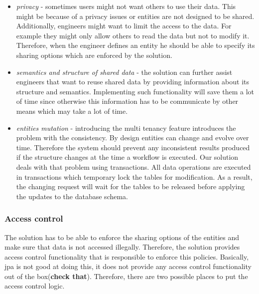 \documentclass[a4paper, notitlepage]{article}
\begin{document}
\begin{itemize}

	\item \textit{privacy} - sometimes users might not want others to use their data. This might be because of a privacy issues or entities are not designed to be shared. Additionally, engineers might want to limit the access to the data. For example they might only allow others to read the data but not to modify it. Therefore, when the engineer defines an entity he should be able to specify its sharing options which are enforced by the solution.
	 
	\item \textit{semantics and structure of shared data} - the solution can further assist engineers that want to reuse shared data by providing information about its structure and semantics. Implementing such functionality will save them a lot of time since otherwise this information has to be communicate by other means which may take a lot of time.
	
	\item \textit{entities mutation} - introducing the multi tenancy feature introduces the problem with the consistency. By design entities can change and evolve over time. Therefore the system should prevent any inconsistent results produced if the structure changes at the time a workflow is executed. Our solution deals with that problem using transactions. All data operations are executed in transactions which temporary lock the tables for modification. As a result, the changing request will wait for the tables to be released before applying the updates to the database schema.
\end{itemize}


\subsubsection{Access control}

The solution has to be able to enforce the sharing options of the entities and make sure that data is not accessed illegally. Therefore, the solution provides access control functionality that is responsible to enforce this policies. Basically, jpa is not good at doing this, it does not provide any access control functionality out of the box(\textbf{check that}). Therefore, there are two possible places to put the access control logic. 
\end{document}
